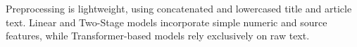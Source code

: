 Preprocessing is lightweight, using concatenated and lowercased title and
article text. Linear and Two-Stage models incorporate simple numeric and
source features, while Transformer-based models rely exclusively on raw
text.
